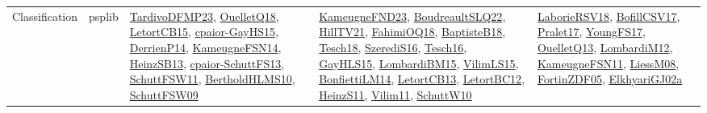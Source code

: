 {\begin{longtable}{lp{3cm}>{\raggedright}p{6cm}>{\raggedright}p{6cm}p{8cm}}
Classification & psplib & \href{papers/TardivoDFMP23.pdf}{TardivoDFMP23}\cite{TardivoDFMP23}, \href{papers/OuelletQ18.pdf}{OuelletQ18}\cite{OuelletQ18}, \href{articles/LetortCB15.pdf}{LetortCB15}\cite{LetortCB15}, \href{papers/cpaior-GayHS15.pdf}{cpaior-GayHS15}\cite{cpaior-GayHS15}, \href{papers/DerrienP14.pdf}{DerrienP14}\cite{DerrienP14}, \href{articles/KameugneFSN14.pdf}{KameugneFSN14}\cite{KameugneFSN14}, \href{articles/HeinzSB13.pdf}{HeinzSB13}\cite{HeinzSB13}, \href{papers/cpaior-SchuttFS13.pdf}{cpaior-SchuttFS13}\cite{cpaior-SchuttFS13}, \href{articles/SchuttFSW11.pdf}{SchuttFSW11}\cite{SchuttFSW11}, \href{papers/BertholdHLMS10.pdf}{BertholdHLMS10}\cite{BertholdHLMS10}, \href{papers/SchuttFSW09.pdf}{SchuttFSW09}\cite{SchuttFSW09} & \href{papers/KameugneFND23.pdf}{KameugneFND23}\cite{KameugneFND23}, \href{papers/BoudreaultSLQ22.pdf}{BoudreaultSLQ22}\cite{BoudreaultSLQ22}, \href{papers/HillTV21.pdf}{HillTV21}\cite{HillTV21}, \href{articles/FahimiOQ18.pdf}{FahimiOQ18}\cite{FahimiOQ18}, \href{articles/BaptisteB18.pdf}{BaptisteB18}\cite{BaptisteB18}, \href{papers/Tesch18.pdf}{Tesch18}\cite{Tesch18}, \href{papers/SzerediS16.pdf}{SzerediS16}\cite{SzerediS16}, \href{papers/Tesch16.pdf}{Tesch16}\cite{Tesch16}, \href{papers/GayHLS15.pdf}{GayHLS15}\cite{GayHLS15}, \href{papers/LombardiBM15.pdf}{LombardiBM15}\cite{LombardiBM15}, \href{papers/VilimLS15.pdf}{VilimLS15}\cite{VilimLS15}, \href{papers/BonfiettiLM14.pdf}{BonfiettiLM14}\cite{BonfiettiLM14}, \href{papers/LetortCB13.pdf}{LetortCB13}\cite{LetortCB13}, \href{papers/LetortBC12.pdf}{LetortBC12}\cite{LetortBC12}, \href{papers/HeinzS11.pdf}{HeinzS11}\cite{HeinzS11}, \href{papers/Vilim11.pdf}{Vilim11}\cite{Vilim11}, \href{papers/SchuttW10.pdf}{SchuttW10}\cite{SchuttW10} & \href{articles/LaborieRSV18.pdf}{LaborieRSV18}\cite{LaborieRSV18}, \href{papers/BofillCSV17.pdf}{BofillCSV17}\cite{BofillCSV17}, \href{papers/Pralet17.pdf}{Pralet17}\cite{Pralet17}, \href{papers/YoungFS17.pdf}{YoungFS17}\cite{YoungFS17}, \href{papers/OuelletQ13.pdf}{OuelletQ13}\cite{OuelletQ13}, \href{articles/LombardiM12.pdf}{LombardiM12}\cite{LombardiM12}, \href{papers/KameugneFSN11.pdf}{KameugneFSN11}\cite{KameugneFSN11}, \href{articles/LiessM08.pdf}{LiessM08}\cite{LiessM08}, \href{papers/FortinZDF05.pdf}{FortinZDF05}\cite{FortinZDF05}, \href{papers/ElkhyariGJ02a.pdf}{ElkhyariGJ02a}\cite{ElkhyariGJ02a}\\

\end{longtable}}
